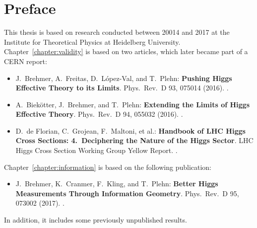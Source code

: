 
\chapter*{Preface}
\label{chapter:preface}

This thesis is based on research conducted between 20014 and 2017 at
the Institute for Theoretical Physics at Heidelberg
University. Chapter~\ref{chapter:validity} is based on two articles,
which later became part of a CERN report:
% 
\begin{itemize}
  \item[\cite{Brehmer:2015rna}] J.~Brehmer, A.~Freitas, D.~L\'opez-Val, and T.~Plehn:\newline
	\textbf{Pushing Higgs Effective Theory to its Limits}.\newline
	Phys.~Rev.~D 93, 075014 (2016). .
  \item[\cite{Biekotter:2016ecg}] A.~Biek\"otter, J.~Brehmer, and T.~Plehn:\newline
	\textbf{Extending the Limits of Higgs Effective Theory}.\newline
	Phys.~Rev.~D 94, 055032 (2016). . 
  \item[\cite{deFlorian:2016spz}] D.~de Florian, C.~Grojean, F.~Maltoni, et al.:\newline
        \textbf{Handbook of LHC Higgs Cross Sections: 4.~Deciphering the Nature of the Higgs Sector}.\newline
        LHC Higgs Cross Section Working Group Yellow Report. .
\end{itemize}
%
Chapter~\ref{chapter:information} is based on the following publication:
%
\begin{itemize}
  \item[\cite{Brehmer:2016nyr}] J.~Brehmer, K.~Cranmer, F.~Kling, and T.~Plehn:\newline
	\textbf{Better Higgs Measurements Through Information Geometry}.\newline
       Phys.~Rev.~D 95, 073002 (2017). .
\end{itemize}
%
In addition, it includes some previously unpublished results.


